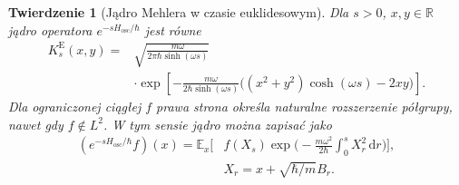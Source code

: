 \documentclass[11pt,a4paper,oneside]{report}
\numberwithin{equation}{chapter}
\theoremstyle{plain}
\newtheorem{twierdzenie}{Twierdzenie}[chapter]
\theoremstyle{definition}
\theoremstyle{remark}
\newcommand{\R}{\mathbb{R}}
\newcommand{\E}{\mathbb{E}}
\newcommand{\dd}{\mathrm{d}}
\begin{document}
\begin{twierdzenie}[Jądro Mehlera w czasie euklidesowym]\label{thm:volIII:16:05}
\label{th:Mehler-euclidean}
Dla $s>0$, $x,y\in\R$ jądro operatora
$e^{-sH_{\mathrm{osc}}/\hbar}$ jest równe
\[
\begin{split}
 K_s^{\mathrm E}(x,y)
  ={}&\sqrt{\frac{m\omega}{2\pi\hbar\sinh(\omega s)}}\\
 &\cdot\exp\left[-\frac{m\omega}{2\hbar\sinh(\omega s)}
 \bigl((x^2+y^2)\cosh(\omega s)-2xy\bigr)\right].
\end{split}
\tag{16.9}\label{eq:Mehler-E}
\]
Dla ograniczonej ciągłej $f$ prawa strona określa
naturalne rozszerzenie półgrupy, nawet gdy $f\notin L^2$.
W tym sensie jądro można zapisać jako
\[
\begin{split}
 (e^{-sH_{\mathrm{osc}}/\hbar}f)(x)
 =\E_x\Big[&f(X_s)\exp\Big(
  -\frac{m\omega^2}{2\hbar}\int_0^sX_r^2\,\dd r
 \Big)\Big],\\
 &X_r=x+\sqrt{\hbar/m}B_r.
\end{split}
\tag{16.10}\label{eq:Mehler-FK}
\]
\end{twierdzenie}
\end{document}
